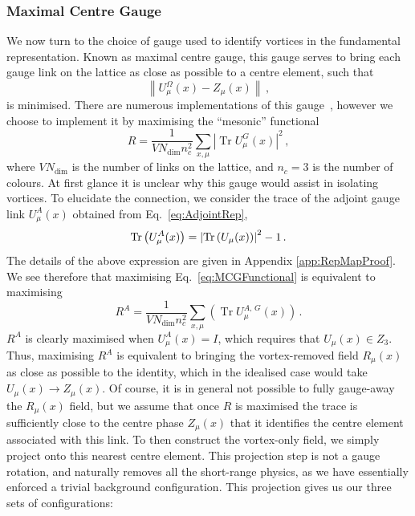 \subsubsection{Maximal Centre Gauge}\label{sec:MCG}
We now turn to the choice of gauge used to identify vortices in the fundamental representation. Known as maximal centre gauge, this gauge serves to bring each gauge link on the lattice as close as possible to a centre element, such that
%
\begin{equation}
\left\| U _ { \mu } ^ { \Omega } ( x ) - Z _ { \mu } ( x ) \right\|\, ,
\end{equation}
%
is minimised. There are numerous implementations of this gauge~\cite{Montero:1999by,Faber:1999sq}, however we choose to implement it by maximising the ``mesonic'' functional~\cite{Langfeld:2003ev}
%
\begin{equation}
R = \frac { 1 } { V N _ { \operatorname { dim } } n _ { c } ^ { 2 } } \sum _ { x , \mu } \left| \operatorname { Tr } U _ { \mu } ^ { G } ( x ) \right| ^ { 2 }\, ,
\label{eq:MCGFunctional}
\end{equation} 
%
where $VN _ { \operatorname { dim } }$ is the number of links on the lattice, and $n_c=3$ is the number of colours. At first glance it is unclear why this gauge would assist in isolating vortices. To elucidate the connection, we consider the trace of the adjoint gauge link $U^A_\mu(x)$ obtained from Eq.~\ref{eq:AdjointRep},
%
\begin{equation}
\operatorname{Tr}\left(U^A_\mu(x)\right) = \left|\operatorname{Tr}\left(U_\mu(x)\right)\right|^2 - 1\, .
\end{equation}
%
The details of the above expression are given in Appendix \ref{app:RepMapProof}. We see therefore that maximising Eq.~\ref{eq:MCGFunctional} is equivalent to maximising
%
\begin{equation}
R^A = \frac { 1 } { V N _ { \operatorname { dim } } n _ { c } ^ { 2 } } \sum _ { x , \mu } \left( \operatorname { Tr } U _ { \mu } ^ { A,\,G } ( x ) \right)\, .
\end{equation}
%
$R^A$ is clearly maximised when $U_\mu^A(x)=I$, which requires that $U_\mu(x) \in Z_3$. Thus, maximising $R^A$ is equivalent to bringing the vortex-removed field $R_\mu(x)$ as close as possible to the identity, which in the idealised case would take $U_\mu(x)\rightarrow Z_\mu(x)$. Of course, it is in general not possible to fully gauge-away the $R_\mu(x)$ field, but we assume that once $R$ is maximised the trace is sufficiently close to the centre phase $Z_\mu(x)$ that it identifies the centre element associated with this link. To then construct the vortex-only field, we simply project onto this nearest centre element. This projection step is not a gauge rotation, and naturally removes all the short-range physics, as we have essentially enforced a trivial background configuration. This projection gives us our three sets of configurations:
